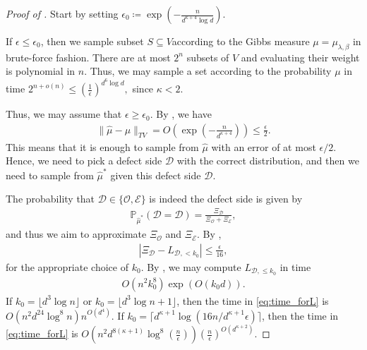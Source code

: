 \documentclass[reqno,a4paper,11pt]{amsart}
\newcommand{\cD}{\mathcal{D}}
\newcommand{\cE}{\mathcal{E}}
\newcommand{\cO}{\mathcal{O}}
\newcommand{\ex}{\kappa}
\begin{document}
\begin{proof}[Proof of ]
    Start by setting $\epsilon_0 \coloneqq \exp\left(- \frac{n}{d^{\ex+4} \log d} \right)$.

    If $\epsilon \leq \epsilon_0$, then we sample subset $S \subseteq V$according to the Gibbs measure $\mu=\mu_{\lambda, \beta}$ in brute-force fashion. There are at most $2^n$ subsets of $V$ and evaluating their weight is polynomial in $n$. Thus, we may sample a set according to the probability $\mu$ in time
    $2^{n+o(n)}\le \left( \frac{1}{\epsilon}\right)^{d^6 \log d},$
    since $\ex<2$.

    Thus, we may assume that $\epsilon \geq \epsilon_0$. By , we have
    \begin{align*}
        \lVert\hat \mu - \mu \rVert_{TV} = O\left( \exp\left( - \frac{n}{d^{\ex+4}}\right)\right) \leq \frac{\epsilon}{2}.
    \end{align*}
    This means that it is enough to sample from $\hat{\mu}$ with an error of at most $\epsilon/2$.
    Hence, we need to pick a defect side $\cD$ with the correct distribution, and then we need to sample from $\hat{\mu}^*$ given this defect side $\cD$.
    
    The probability that $\cD \in \{\cO, \cE\}$ is indeed the defect side is given by
    \begin{align} \label{eq:prob_defect}
        \mathbb{P}_{\hat \mu^*}\left(\bm{\cD}=\cD \right) = \frac{\Xi_{\cD}}{\Xi_{\cO}+\Xi_{\cE}},
    \end{align}
    and thus we aim to approximate $\Xi_{\cO}$ and $ \Xi_{\cE}$.
    By , 
    \begin{align} \label{eq:approx_good}
        |\Xi_{\cD} - L_{\cD, < k_0}| \leq \frac{\epsilon}{16},
    \end{align}
    for the appropriate choice of $k_0$. By , we may compute $L_{\cD, \leq k_0}$ in time 
    \begin{align} \label{eq:time_forL}
        O(n^2 k_0^8) \exp(O(k_0 d)).
    \end{align}
    If $k_0=\lfloor d^3\log n \rfloor$ or $k_0=\lfloor d^3\log n +1\rfloor$, then the time in \eqref{eq:time_forL} is $ O(n^{2}d^{24}\log^{8}n)n^{O(d^4)}$. If $k_0=\lceil d^{\ex+1}\log(16n/d^{\ex+1}\epsilon)\rceil$, then the time in \eqref{eq:time_forL} is $O\left(n^{2}d^{8(\ex+1)}\log^8\left(\frac{n}{\epsilon}\right)\right)\left(\frac{n}{\epsilon}\right)^{O(d^{\ex+2})}$. 
    

\end{proof}
\end{document}
